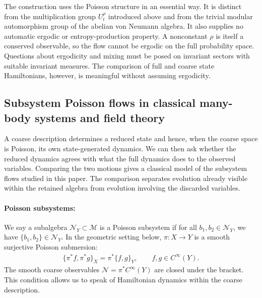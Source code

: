\documentclass[a4paper,11pt]{article}
\theoremstyle{definition}
\begin{document}
The construction uses the Poisson structure in an essential way. It is distinct from the multiplication group $U_t^\rho$ introduced above and from the trivial modular automorphism group of the abelian von Neumann algebra. It also supplies no automatic ergodic or entropy-production property. A nonconstant $\rho$ is itself a conserved observable, so the flow cannot be ergodic on the full probability space. Questions about ergodicity and mixing must be posed on invariant sectors with suitable invariant measures. The comparison of full and coarse state Hamiltonians, however, is meaningful without assuming ergodicity.

\subsection{Subsystem Poisson flows in classical many-body systems and field theory}
\label{subsec:classical-subalgebra-Hamiltonian}

A coarse description determines a reduced state and hence, when the coarse space is Poisson, its own state-generated dynamics. We can then ask whether the reduced dynamics agrees with what the full dynamics does to the observed variables. Comparing the two motions gives a classical model of the subsystem flows studied in this paper. The comparison separates evolution already visible within the retained algebra from evolution involving the discarded variables.

\paragraph{Poisson subsystems:} We say a subalgebra $\mathcal N_Y\subset \mathcal M$ is a Poisson subsystem if for all $b_1,b_2\in \mathcal N_Y$, we have $\{b_1,b_2\}\in \mathcal N_Y$. In the geometric setting below, $\pi:X\to Y$ is a smooth surjective Poisson submersion:
\begin{align}\label{eq:classical-Poisson-subsystem}
    \{\pi^*f,\pi^*g\}_X=\pi^*\{f,g\}_Y,
    \qquad f,g\in C^\infty(Y).
\end{align}
The smooth coarse observables $\mathcal N=\pi^*C^\infty(Y)$ are closed under the bracket. This condition allows us to speak of Hamiltonian dynamics within the coarse description.
\end{document}
